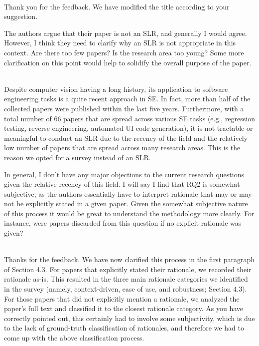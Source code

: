 \documentclass[12pt]{article}
\newcommand{\nb}[2]{
		{\sf
			\fcolorbox{myyellow}{yellow}{\scriptsize\textbf{#1}}%
			$\blacktriangleright$%
			{\color{myblue}\fontsize{7pt}{8pt}\selectfont\textbf{#2}}%
		}%
	}
\newcommand{\nb}[2]{}
\newcommand\mohammad[1]{\nb{Mohammad}   {#1}}
\newcommand\andrea[1]{\nb{Andrea}{#1}}
\newcommand\response[1]{\textcolor{responseColor}{\\#1\\}}
\begin{document}
\response{
Thank you for the feedback. 
We have modified the title according to your suggestion.
}







The authors argue that their paper 
is not an SLR, and generally I would agree. 
However, I think they need to clarify 
why an SLR is not appropriate in this context. 
Are there too few papers? 
Is the research area too young? 
Some more clarification on this point would help to 
solidify the overall purpose of the paper.


\response{
Despite computer vision having a long history, 
its application to software engineering tasks 
is a quite recent approach in SE. 
In fact, more than half of the collected papers 
were published within the last five years.
Furthermore, with a total number of 66 papers 
that are spread across various SE tasks 
(e.g., regression testing, reverse engineering, 
automated UI code generation), 
it is not tractable or meaningful to conduct 
an SLR due to the recency of the field 
and the relatively low number of papers 
that are spread across many research areas.
This is the reason we opted for 
a survey instead of an SLR.
}






In general, 
I don’t have any major objections 
to the current research questions 
given the relative recency of this field. 
I will say I find that RQ2 is somewhat subjective, 
as the authors essentially have to 
interpret rationale that may or may not be 
explicitly stated in a given paper. 
Given the somewhat subjective nature 
of this process it would be great to understand 
the methodology more clearly. For instance, 
were papers discarded from this question 
if no explicit rationale was given?


\response{
Thanks for the feedback. We have now clarified this process 
in the first paragraph of Section 4.3.
For papers that explicitly stated their rationale, 
we recorded their rationale as-is. 
This resulted in the three main 
rationale categories we identified in the survey 
(namely, context-driven, ease of use, and robustness; 
Section 4.3). 
For those papers that did not 
explicitly mention a rationale, 
we analyzed the paper's full text and 
classified it to the closest rationale category. 
As you have correctly pointed out, 
this certainly had to involve some subjectivity, 
which is due to the lack of 
ground-truth classification of rationales, 
and therefore we had to come up with the above classification process.  
}
\end{document}

